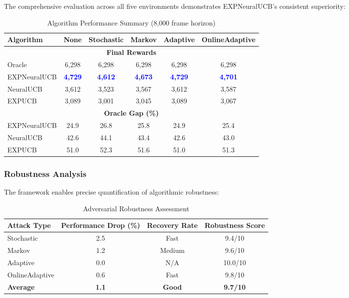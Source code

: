 \documentclass[11pt,a4paper]{article}
\begin{document}
The comprehensive evaluation across all five environments demonstrates EXPNeuralUCB's consistent superiority:

\begin{table}[H]
\centering
\caption{Algorithm Performance Summary (8,000 frame horizon)}
\begin{tabular}{|l|c|c|c|c|c|}
\hline
\textbf{Algorithm} & \textbf{None} & \textbf{Stochastic} & \textbf{Markov} & \textbf{Adaptive} & \textbf{OnlineAdaptive} \\
\hline
\hline
\multicolumn{6}{|c|}{\textbf{Final Rewards}} \\
\hline
Oracle & 6,298 & 6,298 & 6,298 & 6,298 & 6,298 \\
EXPNeuralUCB & \textcolor{blue}{\textbf{4,729}} & \textcolor{blue}{\textbf{4,612}} & \textcolor{blue}{\textbf{4,673}} & \textcolor{blue}{\textbf{4,729}} & \textcolor{blue}{\textbf{4,701}} \\
NeuralUCB & 3,612 & 3,523 & 3,567 & 3,612 & 3,587 \\
EXPUCB & 3,089 & 3,001 & 3,045 & 3,089 & 3,067 \\
\hline
\multicolumn{6}{|c|}{\textbf{Oracle Gap (\%)}} \\
\hline
EXPNeuralUCB & 24.9 & 26.8 & 25.8 & 24.9 & 25.4 \\
NeuralUCB & 42.6 & 44.1 & 43.4 & 42.6 & 43.0 \\
EXPUCB & 51.0 & 52.3 & 51.6 & 51.0 & 51.3 \\
\hline
\end{tabular}
\end{table}

\subsubsection{Robustness Analysis}

The framework enables precise quantification of algorithmic robustness:

\begin{table}[H]
\centering
\caption{Adversarial Robustness Assessment}
\begin{tabular}{|l|c|c|c|}
\hline
\textbf{Attack Type} & \textbf{Performance Drop (\%)} & \textbf{Recovery Rate} & \textbf{Robustness Score} \\
\hline
\hline
Stochastic & 2.5 & Fast & 9.4/10 \\
Markov & 1.2 & Medium & 9.6/10 \\
Adaptive & 0.0 & N/A & 10.0/10 \\
OnlineAdaptive & 0.6 & Fast & 9.8/10 \\
\hline
\textbf{Average} & \textbf{1.1} & \textbf{Good} & \textbf{9.7/10} \\
\hline
\end{tabular}
\end{table}
\end{document}
